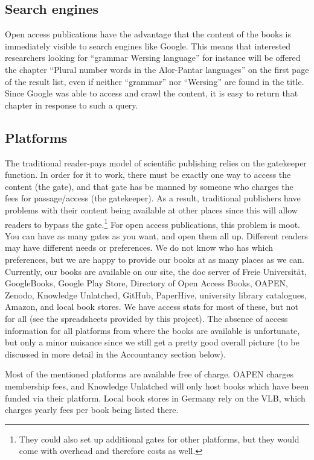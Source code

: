 \documentclass[guidelines,nonflat,modfonts] {langsci/langscibook}
\begin{document}
\subsection{Search engines}
Open access publications have the advantage that the content of the books is immediately visible to search engines like Google. This means that interested researchers looking for ``grammar Wersing language'' for instance will be offered the chapter ``Plural number words in the Alor-Pantar languages'' on the first page of the result list, even if neither ``grammar'' nor ``Wersing'' are found in the title. Since Google was able to access and crawl the content, it is easy to return that chapter in response to such a query. 


\subsection{Platforms}
The traditional reader-pays model of scientific publishing relies on the gatekeeper function. In order for it to work, there must be exactly one way to access the content (the gate), and that gate has be manned by someone who charges the fees for passage/access (the gatekeeper). As a result, traditional publishers have problems with their content being available at other places since this will allow readers to bypass the gate.\footnote{They could also set up additional gates for other platforms, but they would come with overhead and therefore costs as well.} For open access publications, this problem is moot. You can have as many gates as you want, and open them all up. Different readers may have different needs or preferences. We do not know who has which preferences, but we are happy to provide our books at as many places as we can. Currently, our books are available on our site, the doc server of Freie Universität, GoogleBooks, Google Play Store, Directory of Open Access Books, OAPEN, Zenodo, Knowledge Unlatched, GitHub, PaperHive, university library catalogues, Amazon, and local book stores. We have access stats for most of these, but not for all (see the spreadsheets provided by this project). The absence of access information for all platforms from where the books are available is unfortunate, but only a minor nuisance since we still get a pretty good overall picture (to be discussed in more detail in the Accountancy %
section below).

Most of the mentioned platforms are available free of charge. OAPEN charges membership fees, and Knowledge Unlatched will only host books which have been funded via their platform. Local book stores in Germany rely on the VLB, which charges yearly fees per book being listed there.
\end{document}
